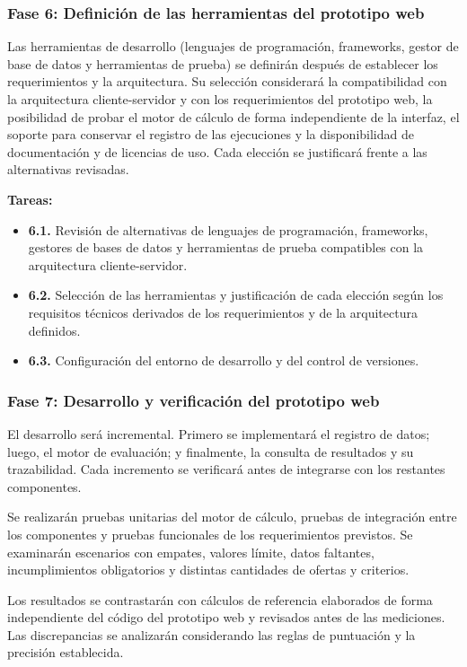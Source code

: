 \documentclass[12pt,a4paper]{article}
\begin{document}
\subsubsection{Fase 6: Definición de las herramientas del prototipo web}

Las herramientas de desarrollo (lenguajes de programación, frameworks, gestor de base de datos y herramientas de prueba) se definirán después de establecer los requerimientos y la arquitectura. Su selección considerará la compatibilidad con la arquitectura cliente-servidor y con los requerimientos del prototipo web, la posibilidad de probar el motor de cálculo de forma independiente de la interfaz, el soporte para conservar el registro de las ejecuciones y la disponibilidad de documentación y de licencias de uso. Cada elección se justificará frente a las alternativas revisadas.

\textbf{Tareas:}

\begin{itemize}
\item \textbf{6.1.} Revisión de alternativas de lenguajes de programación, frameworks, gestores de bases de datos y herramientas de prueba compatibles con la arquitectura cliente-servidor.
\item \textbf{6.2.} Selección de las herramientas y justificación de cada elección según los requisitos técnicos derivados de los requerimientos y de la arquitectura definidos.
\item \textbf{6.3.} Configuración del entorno de desarrollo y del control de versiones.
\end{itemize}

\subsubsection{Fase 7: Desarrollo y verificación del prototipo web}

El desarrollo será incremental. Primero se implementará el registro de datos; luego, el motor de evaluación; y finalmente, la consulta de resultados y su trazabilidad. Cada incremento se verificará antes de integrarse con los restantes componentes.

Se realizarán pruebas unitarias del motor de cálculo, pruebas de integración entre los componentes y pruebas funcionales de los requerimientos previstos. Se examinarán escenarios con empates, valores límite, datos faltantes, incumplimientos obligatorios y distintas cantidades de ofertas y criterios.

Los resultados se contrastarán con cálculos de referencia elaborados de forma independiente del código del prototipo web y revisados antes de las mediciones. Las discrepancias se analizarán considerando las reglas de puntuación y la precisión establecida.
\end{document}
